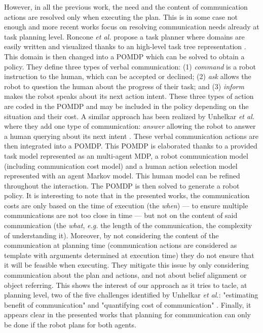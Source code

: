 \documentclass[a4paper,11pt,twoside]{StyleThese}
\begin{document}
However, in all the previous work, the need and the content of communication actions are resolved only when executing the plan. This is in some case not enough and more recent works focus on resolving communication needs already at task planning level.
Roncone \textit{et al.} propose a task planner where domains are easily written and visualized thanks to an high-level task tree representation \cite{roncone2017transparent}. This domain is then changed into a POMDP which can be solved to obtain a policy. They define three types of verbal communication: (1) \textit{command} is a robot instruction to the human, which can be accepted or declined; (2) \textit{ask} allows the robot to question the human about the progress of their task; and (3) \textit{inform} makes the robot speaks about its next action intent. These three types of action are coded in the POMDP and may be included in the policy depending on the situation and their cost.
A similar approach has been realized by Unhelkar \textit{et al.} where they add one type of communication: \textit{answer} allowing the robot to answer a human querying about its next intent \cite{unhelkar2020decision}. These verbal communication actions are then integrated into a POMDP. This POMDP is elaborated thanks to a provided task model represented as an multi-agent MDP, a robot communication model (including communication cost model) and a human action selection model represented with an agent Markov model. This human model can be refined throughout the interaction. The POMDP is then solved to generate a robot policy.
It is interesting to note that in the presented works, the communication costs are only based on the time of execution (the \textit{when}) --- to ensure multiple communications are not too close in time --- but not on the content of said communication (the \textit{what}, \textit{e.g.} the length of the communication, the complexity of understanding it). Moreover, by not considering the content of the communication at planning time (communication actions are considered as template with arguments determined at execution time) they do not ensure that it will be feasible when executing. They mitigate this issue by only considering communication about the plan and actions, and not about belief alignment or object referring. This shows the interest of our approach as it tries to tacle, at planning level, two of the five challenges identified by Unhelkar \textit{et al.}: "estimating benefit of communication" and "quantifying cost of communication" \cite{unhelkar2017challenges}.
Finally, it appears clear in the presented works that planning for communication can only be done if the robot plans for both agents.
\end{document}
